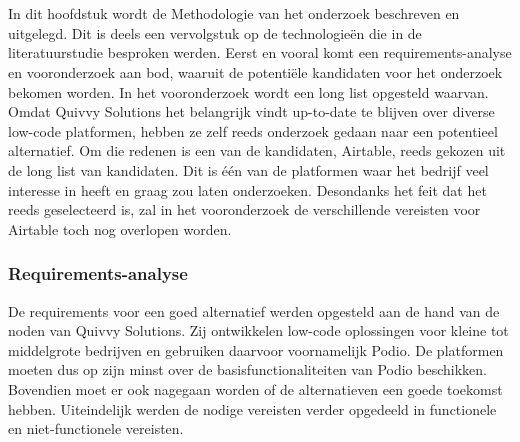 
\chapter{}%
\label{ch:methodologie}



In dit hoofdstuk wordt de Methodologie van het onderzoek beschreven en uitgelegd. Dit is deels een vervolgstuk op de technologieën die in de literatuurstudie besproken werden. Eerst en vooral komt een requirements-analyse en vooronderzoek aan bod, waaruit de potentiële kandidaten voor het onderzoek bekomen worden. In het vooronderzoek wordt een long list opgesteld waarvan. \\

Omdat Quivvy Solutions het belangrijk vindt up-to-date te blijven over diverse low-code platformen, hebben ze zelf reeds onderzoek gedaan naar een potentieel alternatief. Om die redenen is een van de kandidaten, Airtable, reeds gekozen uit de long list van kandidaten. Dit is één van de platformen waar het bedrijf veel interesse in heeft en graag zou laten onderzoeken. Desondanks het feit dat het reeds geselecteerd is, zal in het vooronderzoek de verschillende vereisten voor Airtable toch nog overlopen worden. \\


\subsection{Requirements-analyse}

De requirements voor een goed alternatief werden opgesteld aan de hand van de noden van Quivvy Solutions. Zij ontwikkelen low-code oplossingen voor kleine tot middelgrote bedrijven en gebruiken daarvoor voornamelijk Podio. De platformen moeten dus op zijn minst over de basisfunctionaliteiten van Podio beschikken. Bovendien moet er ook nagegaan worden of de alternatieven een goede toekomst hebben. Uiteindelijk werden de nodige vereisten verder opgedeeld in functionele en niet-functionele vereisten. \\

